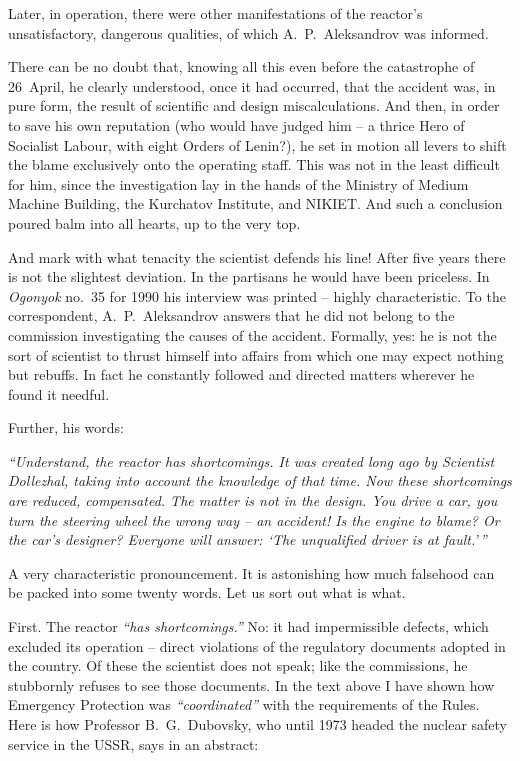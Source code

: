 \documentclass[openright]{bookest}
\begin{document}
Later, in operation, there were other manifestations of the reactor's unsatisfactory, dangerous qualities, of which A.~P.~Aleksandrov was informed.


There can be no doubt that, knowing all this even before the catastrophe of 26~April, he clearly understood, once it had occurred, that the accident was, in pure form, the result of scientific and design miscalculations. And then, in order to save his own reputation (who would have judged him -- a thrice Hero of Socialist Labour, with eight Orders of Lenin?), he set in motion all levers to shift the blame exclusively onto the operating staff. This was not in the least difficult for him, since the investigation lay in the hands of the Ministry of Medium Machine Building, the Kurchatov Institute, and NIKIET. And such a conclusion poured balm into all hearts, up to the very top.

And mark with what tenacity the scientist defends his line! After five years there is not the slightest deviation. In the partisans he would have been priceless. In \textit{Ogonyok} no.~35 for 1990 his interview was printed -- highly characteristic. To the correspondent, A.~P.~Aleksandrov answers that he did not belong to the commission investigating the causes of the accident. Formally, yes: he is not the sort of scientist to thrust himself into affairs from which one may expect nothing but rebuffs. In fact he constantly followed and directed matters wherever he found it needful.

Further, his words:

\begin{personal}
\textit{``Understand, the reactor has shortcomings. It was created long ago by Scientist Dollezhal, taking into account the knowledge of that time. Now these shortcomings are reduced, compensated. The matter is not in the design. You drive a car, you turn the steering wheel the wrong way -- an accident! Is the engine to blame? Or the car's designer? Everyone will answer: `The unqualified driver is at fault.'\,'' }
\end{personal}

A very characteristic pronouncement. It is astonishing how much falsehood can be packed into some twenty words. Let us sort out what is what.

First. The reactor \textit{``has shortcomings.''} No: it had impermissible defects, which excluded its operation -- direct violations of the regulatory documents adopted in the country. Of these the scientist does not speak; like the commissions, he stubbornly refuses to see those documents. In the text above I have shown how Emergency Protection was \textit{``coordinated''} with the requirements of the Rules. Here is how Professor B.~G.~Dubovsky, who until 1973 headed the nuclear safety service in the USSR, says in an abstract:
\end{document}
